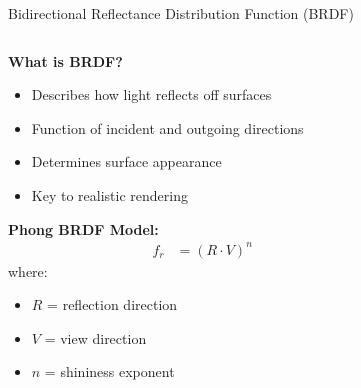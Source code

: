 \documentclass[aspectratio=169]{beamer}
\begin{document}
\begin{frame}{Bidirectional Reflectance Distribution Function (BRDF)}
    \begin{columns}
        \begin{column}{0.5\textwidth}
            \textbf{What is BRDF?}
            \begin{itemize}
                \item<1-> Describes how light reflects off surfaces
                \item<2-> Function of incident and outgoing directions
                \item<3-> Determines surface appearance
                \item<4-> Key to realistic rendering
            \end{itemize}
            
            \vspace{0.5cm}
            \textbf{Phong BRDF Model:}
            \begin{align}
                f_r &= (R \cdot V)^n
            \end{align}
            where:
            \begin{itemize}
                \item $R$ = reflection direction
                \item $V$ = view direction  
                \item $n$ = shininess exponent
            \end{itemize}
        \end{column}
        \begin{column}{0.5\textwidth}
        \end{column}
    \end{columns}
\end{frame}
\end{document}
